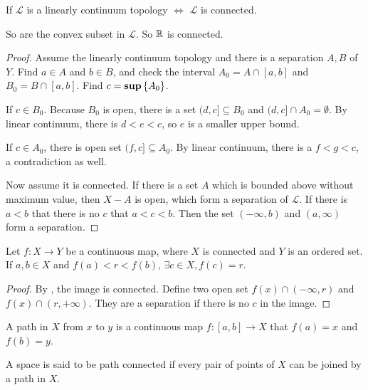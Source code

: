 \begin{theorem}
    If $\mathcal{L}$ is a linearly continuum topology $\Leftrightarrow$ $\mathcal{L}$ is connected. 
    
    So are the convex subset in $\mathcal{L}$. So $\mathbb{R}$ is connected.
\end{theorem}
\begin{proof}
    Assume the linearly continuum topology and there is a separation $A,B$ of $Y$. Find $a \in A$ and $b \in B$, and check the interval $A_0 = A \cap [a,b]$ and $B_0 = B \cap [a,b]$. Find $c = \mathbf{sup} \set{A_0}$. 
    
    If $c \in B_0$. Because $B_0$ is open, there is a set $(d,c] \subseteq B_0$ and $(d,c] \cap A_0 = \emptyset$. By linear continuum, there is $d < e < c$, so $e$ is a smaller upper bound.
    
    If $c \in A_0$, there is open set $(f,c] \subseteq A_0$. By linear continuum, there is a $f < g < c$, a contradiction as well.
    
    Now assume it is connected. If there is a set $A$ which is bounded above without maximum value, then $X - A$ is open, which form a separation of $\mathcal{L}$. If there is $a < b$ that there is no $c$ that $a < c < b$. Then the set $(-\infty, b)$ and $(a, \infty)$ form a separation.
\end{proof}


\begin{theorem}
    Let $f : X \rightarrow Y$ be a continuous map, where $X$ is connected and $Y$ is an ordered set. If $a,b \in X$ and $f(a) < r < f(b)$, $\exists c \in X, f(c) = r$.
\end{theorem}
\begin{proof}
    By , the image is connected. Define two open set $f(x) \cap (-\infty, r)$ and $f(x) \cap (r, +\infty)$. They are a separation if there is no $c$ in the image.
\end{proof}

\begin{definition}
    A path in $X$ from $x$ to $y$ is a continuous map $f: [a,b] \rightarrow X$ that $f(a) = x$ and $f(b) = y$. 
\end{definition}

\begin{definition}
    A space is said to be path connected if every pair of points of $X$ can be joined by a path in $X$.
\end{definition}


